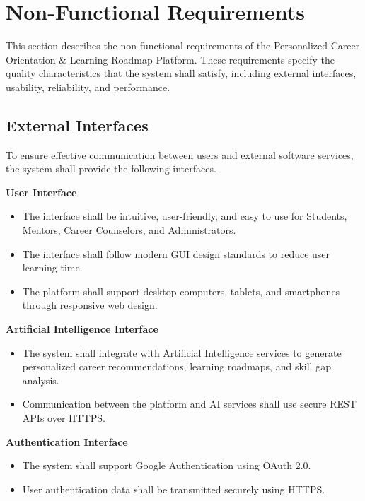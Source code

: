 

\section{Non-Functional Requirements}

This section describes the non-functional requirements of the Personalized Career Orientation \& Learning Roadmap Platform. These requirements specify the quality characteristics that the system shall satisfy, including external interfaces, usability, reliability, and performance.

\subsection{External Interfaces}

To ensure effective communication between users and external software services, the system shall provide the following interfaces.

\textbf{User Interface}

\begin{itemize}
    \item The interface shall be intuitive, user-friendly, and easy to use for Students, Mentors, Career Counselors, and Administrators.
    \item The interface shall follow modern GUI design standards to reduce user learning time.
    \item The platform shall support desktop computers, tablets, and smartphones through responsive web design.
\end{itemize}

\textbf{Artificial Intelligence Interface}

\begin{itemize}
    \item The system shall integrate with Artificial Intelligence services to generate personalized career recommendations, learning roadmaps, and skill gap analysis.
    \item Communication between the platform and AI services shall use secure REST APIs over HTTPS.
\end{itemize}

\textbf{Authentication Interface}

\begin{itemize}
    \item The system shall support Google Authentication using OAuth 2.0.
    \item User authentication data shall be transmitted securely using HTTPS.
\end{itemize}


